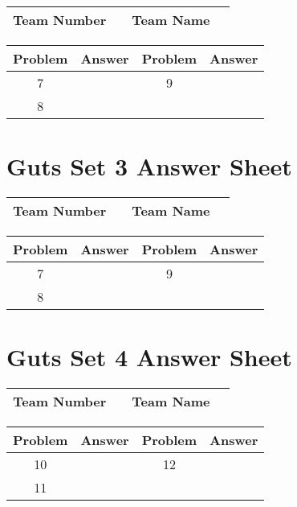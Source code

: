 \documentclass[14pt]{article}
\begin{document}
\begin{center}
\begin{tabular}{|r|r|r|r|}
\hline
	Team Number & \hspace{10em} &
	Team Name & \hspace{15em} \\ \hline
\end{tabular}
\end{center}
\begin{tabularx}{\textwidth}{|c|l|c|X|}\hline
	Problem & Answer & Problem & Answer \\\hline
	7 & \hspace{15em} & 9 & \\\hline
	8 & & & \\\hline
\end{tabularx}

\vspace{30px}

\section*{Guts Set 3 Answer Sheet}

\begin{center}
\begin{tabular}{|r|r|r|r|}
\hline
	Team Number & \hspace{10em} &
	Team Name & \hspace{15em} \\ \hline
\end{tabular}
\end{center}
\begin{tabularx}{\textwidth}{|c|l|c|X|}\hline
	Problem & Answer & Problem & Answer \\\hline
	7 & \hspace{15em} & 9 & \\\hline
	8 & & & \\\hline
\end{tabularx}

\section*{Guts Set 4 Answer Sheet}

\begin{center}
\begin{tabular}{|r|r|r|r|}
\hline
	Team Number & \hspace{10em} &
	Team Name & \hspace{15em} \\ \hline
\end{tabular}
\end{center}
\begin{tabularx}{\textwidth}{|c|l|c|X|}\hline
	Problem & Answer & Problem & Answer \\\hline
	10 & \hspace{15em} & 12 & \\\hline
	11 & & & \\\hline
\end{tabularx}
\end{document}
